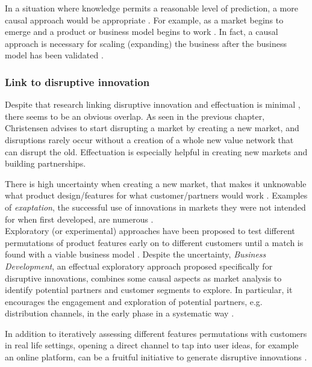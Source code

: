 \documentclass[a4paper,10pt]{article}
\begin{document}
In a situation where knowledge permits a reasonable level of prediction, a more causal approach would be appropriate \cite{effectuationNewVenturePerformance}. 
For example, as a market begins to emerge and a product or business model begins to work \cite{effectuationNewVenturePerformance}. 
In fact, a causal approach is necessary for scaling (expanding) the business after the business model has been validated \cite{effectuationVideoEffectuationVsCausation}.


\subsubsection{Link to disruptive innovation}
Despite that research linking disruptive innovation and effectuation is minimal \cite{managingDisruptiveInnovation}, there seems to be an obvious overlap.
As seen in the previous chapter, Christensen advises to start disrupting a market by creating a new market, and 
disruptions rarely occur without a creation of a whole new value network that can disrupt the old. 
Effectuation is especially helpful in creating new markets and building partnerships.  

There is high uncertainty when creating a new market, that makes it unknowable what product design/features for what customer/partners 
would work \cite{effectuationDisruptiveInnovationBusinessDevelopmentMarketing}. Examples of \emph{exaptation}, the successful use of innovations 
in markets they were not intended for when first developed, are numerous  \cite{managingDisruptiveInnovation}.\\
Exploratory (or experimental) approaches have been proposed to test different permutations of product features early on to different customers until a match is found
with a viable business model \cite{managingDisruptiveInnovation}\cite{effectuationDisruptiveInnovationBusinessDevelopmentMarketing}. 
Despite the uncertainty, \emph{Business Development}, an effectual exploratory approach proposed specifically for disruptive innovations, combines 
some causal aspects as market analysis to identify potential partners and customer segments to explore. In particular, it encourages the engagement and 
exploration of potential partners, e.g. distribution channels, in the early phase in a systematic way \cite{effectuationDisruptiveInnovationBusinessDevelopmentMarketing}.

In addition to iteratively assessing different features permutations with customers in real life settings, opening a direct channel to tap into user ideas, 
for example an online platform, can be a fruitful initiative to generate disruptive innovations \cite{managingDisruptiveInnovation}.
\end{document}
